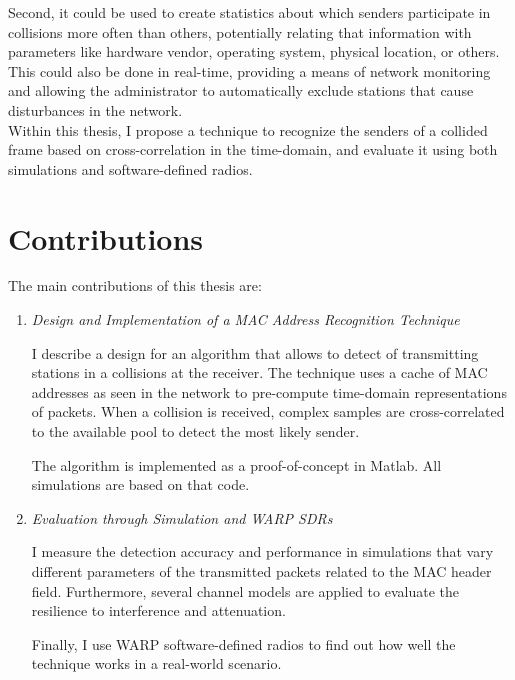 Second, it could be used to create statistics about which senders participate in collisions more often than others, potentially relating that information with parameters like hardware vendor, operating system, physical location, or others. This could also be done in real-time, providing a means of network monitoring and allowing the administrator to automatically exclude stations that cause disturbances in the network.\\

Within this thesis, I propose a technique to recognize the senders of a collided frame based on cross-correlation in the time-domain, and evaluate it using both simulations and software-defined radios.

\clearpage



\section{Contributions}

The main contributions of this thesis are:

\begin{enumerate}
	\item \textit{Design and Implementation of a MAC Address Recognition Technique}

				I describe a design for an algorithm that allows to detect of transmitting stations in a collisions at the receiver. The technique uses a cache of MAC addresses as seen in the network to pre-compute time-domain representations of packets. When a collision is received, complex samples are cross-correlated to the available pool to detect the most likely sender.

				The algorithm is implemented as a proof-of-concept in Matlab. All simulations are based on that code.

	\item \textit{Evaluation through Simulation and WARP SDRs}

				I measure the detection accuracy and performance in simulations that vary different parameters of the transmitted packets related to the MAC header field. Furthermore, several channel models are applied to evaluate the resilience to interference and attenuation.

				Finally, I use WARP software-defined radios to find out how well the technique works in a real-world scenario.

\end{enumerate}


